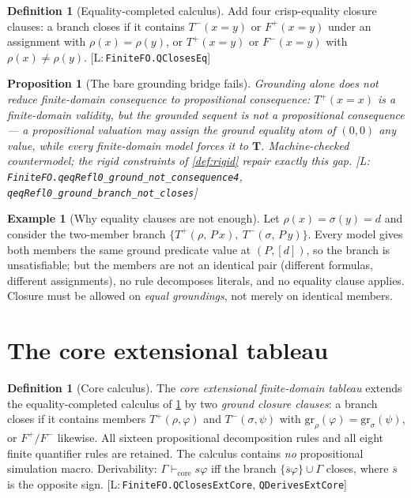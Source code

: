 \documentclass[11pt,a4paper]{article}
\newtheorem{proposition}[theorem]{Proposition}
\theoremstyle{definition}
\newtheorem{definition}[theorem]{Definition}
\newtheorem{example}[theorem]{Example}
\newcommand{\vT}{\mathbf{T}}
\newcommand{\Tp}{T^{+}}\newcommand{\Tm}{T^{-}}
\newcommand{\Fp}{F^{+}}\newcommand{\Fm}{F^{-}}
\newcommand{\lean}[1]{\texttt{#1}}
\newcommand{\qder}{\vdash_{\mathrm{core}}}
\newcommand{\grd}{\mathrm{gr}}
\begin{document}
\begin{definition}[Equality-completed calculus]\label{def:eqcalc}
Add four crisp-equality closure clauses: a branch closes if it contains
$\Tm(x{=}y)$ or $\Fp(x{=}y)$ under an assignment with $\rho(x)=\rho(y)$,
or $\Tp(x{=}y)$ or $\Fm(x{=}y)$ with $\rho(x)\neq\rho(y)$.
[L:\,\lean{FiniteFO.QClosesEq}]
\end{definition}

\begin{proposition}[The bare grounding bridge fails]\label{prop:barebridge}
Grounding alone does not reduce finite-domain consequence to propositional
consequence: $\Tp(x{=}x)$ is a finite-domain validity, but the grounded
sequent is \emph{not} a propositional consequence — a propositional
valuation may assign the ground equality atom of $(0,0)$ any value, while
every finite-domain model forces it to $\vT$. Machine-checked
countermodel; the rigid constraints of \cref{def:rigid} repair exactly
this gap. [L:\,\lean{FiniteFO.qeqRefl0\_ground\_not\_consequence4},
\lean{qeqRefl0\_ground\_branch\_not\_closes}]
\end{proposition}

\begin{example}[Why equality clauses are not enough]\label{ex:extensional}
Let $\rho(x)=\sigma(y)=d$ and consider the two-member branch
$\{\Tp(\rho,\,P\,x),\ \Tm(\sigma,\,P\,y)\}$. Every model gives both
members the same ground predicate value at $(P,[d])$, so the branch is
unsatisfiable; but the members are not an identical pair (different
formulas, different assignments), no rule decomposes literals, and no
equality clause applies. Closure must be allowed on \emph{equal
groundings}, not merely on identical members.
\end{example}

\section{The core extensional tableau}\label{sec:core}

\begin{definition}[Core calculus]\label{def:core}
The \emph{core extensional finite-domain tableau} extends the
equality-completed calculus of \cref{def:eqcalc} by two \emph{ground
closure clauses}: a branch closes if it contains members
$\Tp(\rho,\varphi)$ and $\Tm(\sigma,\psi)$ with
$\grd_\rho(\varphi)=\grd_\sigma(\psi)$, or $\Fp/\Fm$ likewise. All
sixteen propositional decomposition rules and all eight finite quantifier
rules are retained. The calculus contains \emph{no} propositional
simulation macro. Derivability: $\Gamma\qder s\varphi$ iff the branch
$\{\overline{s}\varphi\}\cup\Gamma$ closes, where $\overline{s}$ is the
opposite sign. [L:\,\lean{FiniteFO.QClosesExtCore},
\lean{QDerivesExtCore}]
\end{definition}
\end{document}
